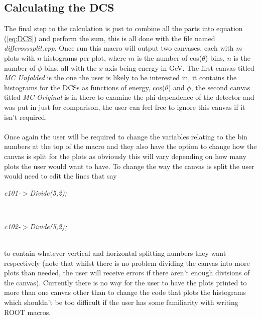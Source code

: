 \documentclass[12pt]{article}
\numberwithin{equation}{section}
\numberwithin{figure}{section}
\begin{document}
\subsection{Calculating the DCS} %
\label{sub:calculating_the_dcs}
The final step to the calculation is just to combine all the parts into equation (\ref{eq:DCS}) and perform the sum, this is all done with the file named \emph{diff\textunderscore cross\textunderscore split.cpp}. Once run this macro will output two canvases, each with $m$ plots with $n$ histograms per plot, where $m$ is the number of cos($\theta$) bins, $n$ is the number of $\phi$ bins, all with the $x$-axis being energy in GeV. The first canvas titled \emph{MC Unfolded} is the one the user is likely to be interested in, it contains the histograms for the DCSs as functions of energy, cos($\theta$) and $\phi$, the second canvas titled \emph{MC Original} is in there to examine the phi dependence of the detector and was put in just for comparison, the user can feel free to ignore this canvas if it isn't required.\\
\\
Once again the user will be required to change the variables relating to the bin numbers at the top of the macro and they also have the option to change how the canvas is split for the plots as obviously this will vary depending on how many plots the user would want to have. To change the way the canvas is split the user would need to edit the lines that say\\
\centerline{\emph{c101-$>$Divide(5,2);}}\\
\centerline{\emph{c102-$>$Divide(5,2);}}\\
to contain whatever vertical and horizontal splitting numbers they want respectively (note that whilst there is no problem dividing the canvas into more plots than needed, the user will receive errors if there aren't enough divisions of the canvas). Currently there is no way for the user to have the plots printed to more than one canvas other than to change the code that plots the histograms which shouldn't be too difficult if the user has some familiarity with writing ROOT macros. 
%
\end{document}
